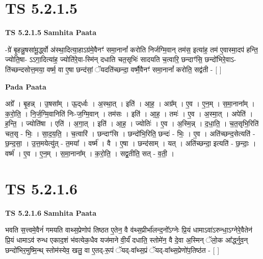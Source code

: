 \documentclass[17pt]{extarticle}
\begin{document}
\section*{ TS 5.2.1.5 }

\textbf{TS 5.2.1.5 } \newline
\textbf{Samhita Paata} \newline

-ग्रे॑ बृ॒हन्नु॒षसा॑मू॒र्द्ध्वो अ॑स्था॒दित्या॒हाऽग्र॑मे॒वैनꣳ॑ समा॒नानां᳚ करोति निर्जग्मि॒वान् तम॑स॒ इत्या॑ह॒ तम॑ ए॒वास्मा॒दप॑ हन्ति॒ ज्योति॒षा- ऽऽगा॒दित्या॑ह॒ ज्योति॑रे॒वा-स्मि॑न् दधाति चत॒सृभिः॑ सादयति च॒त्वारि॒ छन्दाꣳ॑सि॒ छन्दो॑भिरे॒वाऽ-ति॑च्छन्दसोत्त॒मया॒ वर्ष्म॒ वा ए॒षा छन्द॑सां॒ ॅयदति॑च्छन्दा॒ वर्ष्मै॒वैनꣳ॑ समा॒नानां᳚ करोति॒ सद्व॑ती - [  ] \newline

\textbf{Pada Paata} \newline

अग्रे᳚ । बृ॒हन्न् । उ॒षसा᳚म् । ऊ॒द्‌र्ध्वः । अ॒स्था॒त् । इति॑ । आ॒ह॒ । अग्र᳚म् । ए॒व । ए॒न॒म् । स॒मा॒नाना᳚म् । क॒रो॒ति॒ । नि॒र्ज॒ग्मि॒वानिति॑ निः-ज॒ग्मि॒वान् । तम॑सः । इति॑ । आ॒ह॒ । तमः॑ । ए॒व । अ॒स्मा॒त् । अपेति॑ । ह॒न्ति॒ । ज्योति॑षा । एति॑ । अ॒गा॒त् । इति॑ । आ॒ह॒ । ज्योतिः॑ । ए॒व । अ॒स्मि॒न्न् । द॒धा॒ति॒ । च॒त॒सृभि॒रिति॑ चत॒सृ - भिः॒ । सा॒द॒य॒ति॒ । च॒त्वारि॑ । छन्दाꣳ॑सि । छन्दो॑भि॒रिति॒ छन्दः॑ - भिः॒ । ए॒व । अति॑च्छन्द॒सेत्यति॑ - छ॒न्द॒सा॒ । उ॒त्त॒मयेत्यु॑त् - त॒मया᳚ । वर्ष्म॑ । वै । ए॒षा । छन्द॑साम् । यत् । अति॑च्छन्दा॒ इत्यति॑ - छ॒न्दाः॒ । वर्ष्म॑ । ए॒व । ए॒न॒म् । स॒मा॒नाना᳚म् । क॒रो॒ति॒ । सद्व॒तीति॒ सत् - व॒ती॒ ।  \newline




\section*{ TS 5.2.1.6 }

\textbf{TS 5.2.1.6 } \newline
\textbf{Samhita Paata} \newline

भवति स॒त्त्वमे॒वैनं॑ गमयति वाथ्स॒प्रेणोप॑ तिष्ठत ए॒तेन॒ वै व॑थ्स॒प्रीर्भा॑लन्द॒नो᳚ऽग्नेः प्रि॒यं धामाऽवा॑ऽरुन्धा॒ऽग्नेरे॒वैतेन॑ प्रि॒यं धामाऽव॑ रुन्ध एकाद॒शं भ॑वत्येक॒धैव यज॑माने वी॒र्यं॑ दधाति॒ स्तोमे॑न॒ वै दे॒वा अ॒स्मिन् ॅलो॒क आ᳚र्द्ध्नुव॒न् छन्दो॑भिर॒मुष्मि॒न्थ् स्तोम॑स्येव॒ खलु॒ वा ए॒तद्-रू॒पं ॅयद्-वा᳚थ्स॒प्रं ॅयद्-वा᳚थ्स॒प्रेणो॑प॒तिष्ठ॑त - [  ] \newline
\end{document}
